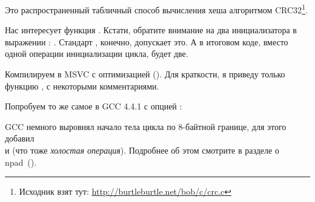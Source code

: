 \label{sec:CRC32}

\newcommand{\URLCRCSRC}{\url{http://burtleburtle.net/bob/c/crc.c}}

Это распространенный табличный способ вычисления хеша алгоритмом 
CRC32\footnote{Исходник взят тут: \URLCRCSRC}.



Нас интересует функция . 
Кстати, обратите внимание на два инициализатора в выражении : . 
Стандарт \CCpp, конечно, допускает это. А в итоговом коде, вместо одной операции инициализации цикла, будет две.

Компилируем в MSVC с оптимизацией (\Ox). 
Для краткости, я приведу только функцию , с некоторыми комментариями.



Попробуем то же самое в GCC 4.4.1 с опцией \Othree:



GCC немного выровнял начало тела цикла по 8-байтной границе, для этого добавил \\
\NOP и  (что тоже \emph{холостая операция}). 
Подробнее об этом смотрите в разделе о npad~().

